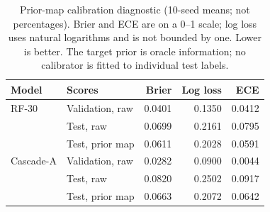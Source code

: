 \begin{table}[!htbp]
\centering
\caption{Prior-map calibration diagnostic (10-seed means; not percentages). Brier and ECE are on a 0--1 scale; log loss uses natural logarithms and is not bounded by one. Lower is better. The target prior is oracle information; no calibrator is fitted to individual test labels.}
\label{tab:calibration}
\small
\setlength{\tabcolsep}{4pt}
\begin{tabularx}{\textwidth}{@{}lXrrr@{}}
\toprule
Model & Scores & Brier & Log loss & ECE \\
\midrule
RF-30 & Validation, raw & 0.0401 & 0.1350 & 0.0412 \\
 & Test, raw & 0.0699 & 0.2161 & 0.0795 \\
 & Test, prior map & 0.0611 & 0.2028 & 0.0591 \\
\addlinespace
Cascade-A & Validation, raw & 0.0282 & 0.0900 & 0.0044 \\
 & Test, raw & 0.0820 & 0.2502 & 0.0917 \\
 & Test, prior map & 0.0663 & 0.2072 & 0.0642 \\
\bottomrule
\end{tabularx}
\end{table}
